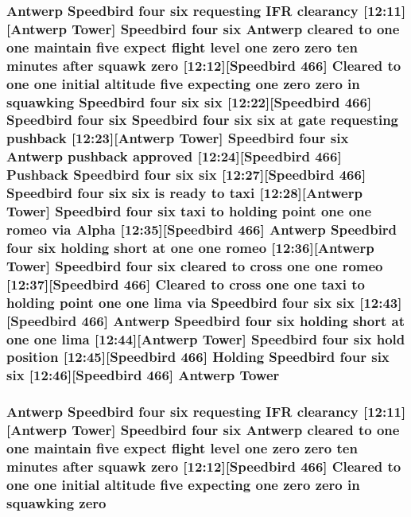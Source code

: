 \subsubsection[{\texorpdfstring{Tower}{Tower}}]{\setlength{\rightskip}{0pt plus 5cm}Antwerp Speedbird four {\bf six} requesting I\+FR clearancy \mbox{[}12\+:11\mbox{]}\mbox{[}Antwerp Tower\mbox{]} Speedbird four {\bf six} Antwerp cleared to {\bf one} {\bf one} maintain five expect flight level {\bf one} {\bf zero} {\bf zero} {\bf ten} minutes after squawk {\bf zero} \mbox{[}12\+:12\mbox{]}\mbox{[}Speedbird 466\mbox{]} Cleared to {\bf one} {\bf one} initial altitude five expecting {\bf one} {\bf zero} {\bf zero} in {\bf squawking} Speedbird four {\bf six} {\bf six} \mbox{[}12\+:22\mbox{]}\mbox{[}Speedbird 466\mbox{]} Speedbird four {\bf six} Speedbird four {\bf six} {\bf six} at gate requesting pushback \mbox{[}12\+:23\mbox{]}\mbox{[}Antwerp Tower\mbox{]} Speedbird four {\bf six} Antwerp pushback {\bf approved} \mbox{[}12\+:24\mbox{]}\mbox{[}Speedbird 466\mbox{]} Pushback Speedbird four {\bf six} {\bf six} \mbox{[}12\+:27\mbox{]}\mbox{[}Speedbird 466\mbox{]} Speedbird four {\bf six} {\bf six} is ready to taxi \mbox{[}12\+:28\mbox{]}\mbox{[}Antwerp Tower\mbox{]} Speedbird four {\bf six} taxi to holding point {\bf one} {\bf one} {\bf romeo} via {\bf Alpha} \mbox{[}12\+:35\mbox{]}\mbox{[}Speedbird 466\mbox{]} Antwerp Speedbird four {\bf six} holding short at {\bf one} {\bf one} {\bf romeo} \mbox{[}12\+:36\mbox{]}\mbox{[}Antwerp Tower\mbox{]} Speedbird four {\bf six} cleared to cross {\bf one} {\bf one} {\bf romeo} \mbox{[}12\+:37\mbox{]}\mbox{[}Speedbird 466\mbox{]} Cleared to cross {\bf one} {\bf one} taxi to holding point {\bf one} {\bf one} {\bf lima} via Speedbird four {\bf six} {\bf six} \mbox{[}12\+:43\mbox{]}\mbox{[}Speedbird 466\mbox{]} Antwerp Speedbird four {\bf six} holding short at {\bf one} {\bf one} {\bf lima} \mbox{[}12\+:44\mbox{]}\mbox{[}Antwerp Tower\mbox{]} Speedbird four {\bf six} hold {\bf position} \mbox{[}12\+:45\mbox{]}\mbox{[}Speedbird 466\mbox{]} Holding Speedbird four {\bf six} {\bf six} \mbox{[}12\+:46\mbox{]}\mbox{[}Speedbird 466\mbox{]} Antwerp Tower}\hypertarget{happyDay4ExpectedATC_8txt_a89eefcb2eadbbad8e4779c0d5874f895}{}\label{happyDay4ExpectedATC_8txt_a89eefcb2eadbbad8e4779c0d5874f895}
\subsubsection[{\texorpdfstring{zero}{zero}}]{\setlength{\rightskip}{0pt plus 5cm}Antwerp Speedbird four {\bf six} requesting I\+FR clearancy \mbox{[}12\+:11\mbox{]}\mbox{[}Antwerp {\bf Tower}\mbox{]} Speedbird four {\bf six} Antwerp cleared to {\bf one} {\bf one} maintain five expect flight level {\bf one} zero zero {\bf ten} minutes after squawk zero \mbox{[}12\+:12\mbox{]}\mbox{[}Speedbird 466\mbox{]} Cleared to {\bf one} {\bf one} initial altitude five expecting {\bf one} zero zero in {\bf squawking} zero}\hypertarget{happyDay4ExpectedATC_8txt_a1cdb3e947394a8f9b50cff125d86fb29}{}\label{happyDay4ExpectedATC_8txt_a1cdb3e947394a8f9b50cff125d86fb29}
